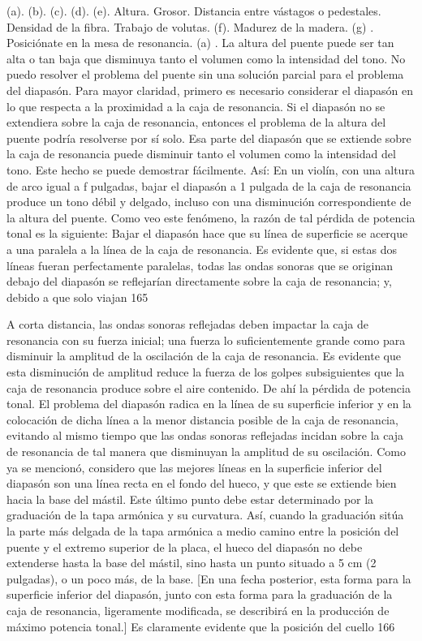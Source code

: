 (a). (b). (c). (d). (e).	Altura. Grosor. Distancia entre vástagos o pedestales. Densidad de la fibra. Trabajo de volutas.
(f). Madurez de la madera.	
(g) .	Posiciónate en la mesa de resonancia.
(a) . La altura del puente puede ser tan alta o tan baja que disminuya tanto el volumen como la intensidad del tono. No puedo resolver el problema del puente sin una solución parcial para el problema del diapasón. Para mayor claridad, primero es necesario considerar el diapasón en lo que respecta a la proximidad a la caja de resonancia. Si el diapasón no se extendiera sobre la caja de resonancia, entonces el problema de la altura del puente podría resolverse por sí solo. Esa parte del diapasón que se extiende sobre la caja de resonancia puede disminuir tanto el volumen como la intensidad del tono. Este hecho se puede demostrar fácilmente. Así: En un violín, con una altura de arco igual a f pulgadas, bajar el diapasón a 1 pulgada de la caja de resonancia produce un tono débil y delgado, incluso con una disminución correspondiente de la altura del puente. Como veo este fenómeno, la razón de tal pérdida de potencia tonal es la siguiente: Bajar el diapasón hace que su línea de superficie se acerque a una paralela a la línea de la caja de resonancia. Es evidente que, si estas dos líneas fueran perfectamente paralelas, todas las ondas sonoras que se originan debajo del diapasón se reflejarían directamente sobre la caja de resonancia; y, debido a que solo viajan
165

A corta distancia, las ondas sonoras reflejadas deben impactar la caja de resonancia con su fuerza inicial; una fuerza lo suficientemente grande como para disminuir la amplitud de la oscilación de la caja de resonancia. Es evidente que esta disminución de amplitud reduce la fuerza de los golpes subsiguientes que la caja de resonancia produce sobre el aire contenido. De ahí la pérdida de potencia tonal.
El problema del diapasón radica en la línea de su superficie inferior y en la colocación de dicha línea a la menor distancia posible de la caja de resonancia, evitando al mismo tiempo que las ondas sonoras reflejadas incidan sobre la caja de resonancia de tal manera que disminuyan la amplitud de su oscilación.
Como ya se mencionó, considero que las mejores líneas en la superficie inferior del diapasón son una línea recta en el fondo del hueco, y que este se extiende bien hacia la base del mástil. Este último punto debe estar determinado por la graduación de la tapa armónica y su curvatura. Así, cuando la graduación sitúa la parte más delgada de la tapa armónica a medio camino entre la posición del puente y el extremo superior de la placa, el hueco del diapasón no debe extenderse hasta la base del mástil, sino hasta un punto situado a 5 cm (2 pulgadas), o un poco más, de la base.
[En una fecha posterior, esta forma para la superficie inferior del diapasón, junto con esta forma para la graduación de la caja de resonancia, ligeramente modificada, se describirá en la producción de máximo
potencia tonal.]
Es claramente evidente que la posición del cuello
166


